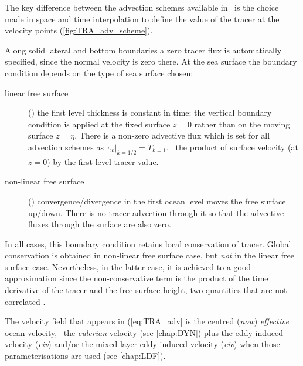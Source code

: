 \documentclass[../main/NEMO_manual]{subfiles}
\begin{document}
The key difference between the advection schemes available in \NEMO\ is the choice made in
space and time interpolation to define the value of the tracer at the velocity points
(\autoref{fig:TRA_adv_scheme}).

Along solid lateral and bottom boundaries a zero tracer flux is automatically specified,
since the normal velocity is zero there.
At the sea surface the boundary condition depends on the type of sea surface chosen:

\begin{description}
\item [linear free surface] ()
  the first level thickness is constant in time:
  the vertical boundary condition is applied at the fixed surface $z = 0$ rather than
  on the moving surface $z = \eta$.
  There is a non-zero advective flux which is set for
  all advection schemes as $\tau_w|_{k = 1/2} = T_{k = 1}$,
  \ie\ the product of surface velocity (at $z = 0$) by the first level tracer value.
\item [non-linear free surface] ()
  convergence/divergence in the first ocean level moves the free surface up/down.
  There is no tracer advection through it so that
  the advective fluxes through the surface are also zero.
\end{description}

In all cases, this boundary condition retains local conservation of tracer.
Global conservation is obtained in non-linear free surface case,
but \textit{not} in the linear free surface case.
Nevertheless, in the latter case,
it is achieved to a good approximation since the non-conservative term is
the product of the time derivative of the tracer and the free surface height,
two quantities that are not correlated
\citep{roullet.madec_JGR00, griffies.pacanowski.ea_MWR01, campin.adcroft.ea_OM04}.

The velocity field that appears in (\autoref{eq:TRA_adv} is
the centred (\textit{now}) \textit{effective} ocean velocity, \ie\ the \textit{eulerian} velocity
(see \autoref{chap:DYN}) plus the eddy induced velocity (\textit{eiv}) and/or
the mixed layer eddy induced velocity (\textit{eiv}) when those parameterisations are used
(see \autoref{chap:LDF}).
\end{document}
